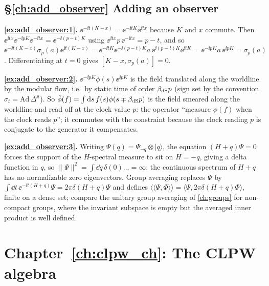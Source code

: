 {\subsection*{\S\ref{ch:add_observer} Adding an observer}
\textbf{\ref{ex:add_observer:1}.} $\ee^{-\ii t(K-x)}=\ee^{-\ii tK}\ee^{\ii tx}$ because $K$ and $x$ commute. Then $\ee^{\ii tx}\ee^{-\ii pK}\ee^{-\ii tx}=\ee^{-\ii(p-t)K}$ using $\ee^{\ii tx}p\,\ee^{-\ii tx}=p-t$, and so $\ee^{-\ii t(K-x)}\sigma_p(a)\ee^{\ii t(K-x)}=\ee^{-\ii tK}\ee^{-\ii(p-t)K}a\,\ee^{\ii(p-t)K}\ee^{\ii tK}=\ee^{-\ii pK}a\,\ee^{\ii pK}=\sigma_p(a)$. Differentiating at $t=0$ gives $[K-x,\sigma_p(a)]=0$.\par
\textbf{\ref{ex:add_observer:2}.} $\ee^{-\ii pK}\phi(s)\ee^{\ii pK}$ is the field translated along the worldline by the modular flow, i.e.\ by static time of order $\beta_{\rm dS}p$ (sign set by the convention $\sigma_t=\mathrm{Ad}\,\Delta^{\ii t}$). So $\hat\phi(f)=\int\mathrm{d} s\,f(s)\phi(s\mp\beta_{\rm dS}p)$ is the field smeared along the worldline and read off at the clock value $p$: the operator ``measure $\phi(f)$ when the clock reads $p$''; it commutes with the constraint because the clock reading $p$ is conjugate to the generator it compensates.\par
\textbf{\ref{ex:add_observer:3}.} Writing $\Psi(q)=\Psi_{-q}\otimes|q\rangle$, the equation $(H+q)\Psi=0$ forces the support of the $H$-spectral measure to sit on $H=-q$, giving a delta function in $q$, so $\|\Psi\|^2=\int\dd q\,\delta(0)\ldots=\infty$: the continuous spectrum of $H+q$ has no normalizable zero eigenvectors. Group averaging replaces $\Psi$ by $\int\dd t\,\ee^{-\ii t(H+q)}\Psi=2\pi\delta(H+q)\Psi$ and defines $\langle\!\langle\Psi,\Phi\rangle\!\rangle=\langle\Psi,2\pi\delta(H+q)\Phi\rangle$, finite on a dense set; compare the unitary group averaging of \cref{ch:groups} for non-compact groups, where the invariant subspace is empty but the averaged inner product is well defined.\par

\section*{Chapter~\ref{ch:clpw_ch}: The CLPW algebra}

}
